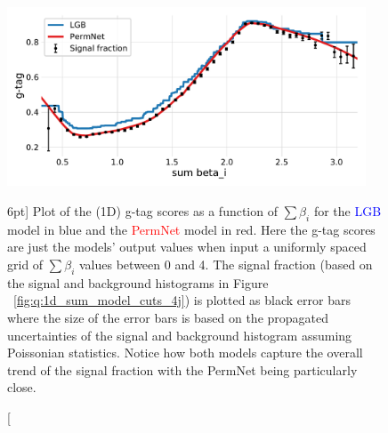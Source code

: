 \documentclass[a4paper, twoside]{tufte-book}
\newcommand{\figref}[1]{Figure ~\ref{#1}}
\begin{document}
\begin{figure}
  \includegraphics[width=0.95\textwidth, trim=10 10 10 20, clip]{figures/quarks/gtag_sum_models_njet=4-down_sample=1.00-ML_vars=vertex-selection=b-ejet_min=4-n_iter_RS_lgb=99-n_iter_RS_xgb=9-cdot_cut=0.90-version=19.pdf}
  \caption[1D Sum Models Predictions and Signal Fraction for 4-jets][6pt]
          {Plot of the (1D) g-tag scores as a function of $\sum \beta_i$ for the \textcolor{blue}{LGB} model in blue and the \textcolor{red}{PermNet} model in red. Here the g-tag scores are just the models' output values when input a uniformly spaced grid of $\sum \beta_i$ values between 0 and 4. The signal fraction (based on the signal and background histograms in \figref{fig:q:1d_sum_model_cuts_4j}) is plotted as black error bars where the size of the error bars is based on the propagated uncertainties of the signal and background histogram assuming Poissonian statistics. Notice how both models capture the overall trend of the signal fraction with the PermNet being particularly close. 
          } 
  \label{fig:q:1d_sum_models_signal_fraction_4j}
\end{figure}
\end{document}
